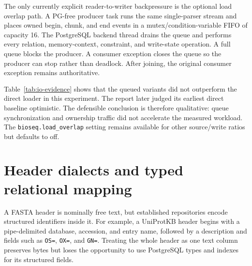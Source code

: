 The only currently explicit reader-to-writer backpressure is the optional load
overlap path.  A PG-free producer task runs the same single-parser stream and
places owned begin, chunk, and end events in a mutex/condition-variable FIFO of
capacity 16.  The PostgreSQL backend thread drains the queue and performs every
relation, memory-context, constraint, and write-state operation.  A full queue
blocks the producer.  A consumer exception closes the queue so the producer
can stop rather than deadlock. After joining, the original consumer exception
remains authoritative.

Table~\ref{tab:io-evidence} shows that the queued variants did not outperform
the direct loader in this experiment. The report later judged its earliest
direct baseline optimistic. The defensible conclusion is therefore
qualitative: queue synchronization and ownership traffic did not accelerate
the measured workload. The \texttt{bioseq.load\_overlap} setting remains
available for other source/write ratios but defaults to off.

\section{Header dialects and typed relational mapping}
\label{sec:io-header-mapping}

A FASTA header is nominally free text, but established repositories encode
structured identifiers inside it.  For example, a UniProtKB header begins with
a pipe-delimited database, accession, and entry name, followed by a description
and fields such as \texttt{OS=}, \texttt{OX=}, and \texttt{GN=}. Treating
the whole header as one text column preserves bytes but loses the opportunity
to use PostgreSQL types and indexes for its structured fields.

